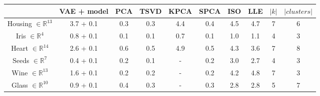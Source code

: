 \begin{tabular}{c|ccccccc|c|c}
                                & \textbf{VAE} + model & \textbf{PCA} & \textbf{TSVD} & \textbf{KPCA} & \textbf{SPCA} & \textbf{ISO} & \textbf{LLE} & $|k|$ & $|clusters|$\\
  \hline
  
  Housing $\in \mathbb{R}^{13}$ & 3.7 + 0.1            & 0.3          & 0.3           & 4.4           & 0.4           & 4.5          & 4.7          & 7     & 6           \\
  Iris $\in \mathbb{R}^{4}$     & 0.8 + 0.1            & 0.1          & 0.1           & 0.7           & 0.1           & 1.0          & 1.1          & 4     & 3           \\
  Heart $\in \mathbb{R}^{14}$   & 2.6 + 0.1            & 0.6          & 0.5           & 4.9           & 0.5           & 4.3          & 3.6          & 7     & 8           \\
  Seeds $\in \mathbb{R}^{7}$    & 0.4 + 0.1            & 0.2          & 0.1           & -             & 0.2           & 3.0          & 2.7          & 4     & 3           \\
  Wine $\in \mathbb{R}^{13}$    & 1.6 + 0.1            & 0.2          & 0.2           & -             & 0.2           & 4.2          & 4.8          & 7     & 3           \\
  Glass $\in \mathbb{R}^{10}$   & 0.9 + 0.1            & 0.4          & 0.3           & -             & 0.3           & 2.8          & 2.8          & 5     & 7           \\
\end{tabular}